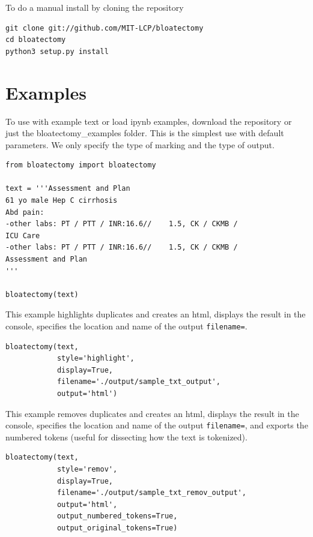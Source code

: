 \documentclass[runningheads,a4paper]{llncs}
\begin{document}
\medskip

\noindent To do a manual install by cloning the repository
\begin{lstlisting}[frame=single, style=customcode]
git clone git://github.com/MIT-LCP/bloatectomy
cd bloatectomy
python3 setup.py install
\end{lstlisting}


\section{Examples}

\noindent   To use with example text or load ipynb examples, download the repository or just the bloatectomy\_examples folder. 
This is the simplest use with default parameters. We only specify the type of marking and the type of output.

\begin{lstlisting}[frame=single, style=customcode]
from bloatectomy import bloatectomy

text = '''Assessment and Plan
61 yo male Hep C cirrhosis
Abd pain:
-other labs: PT / PTT / INR:16.6//    1.5, CK / CKMB /
ICU Care
-other labs: PT / PTT / INR:16.6//    1.5, CK / CKMB /
Assessment and Plan
'''

bloatectomy(text)
\end{lstlisting}

\medskip

\noindent This example highlights duplicates and creates an html, displays the result in the console, specifies the location and name of the output \verb|filename=|.

\begin{lstlisting}[frame=single, style=customcode]
bloatectomy(text, 
            style='highlight',
            display=True,
            filename='./output/sample_txt_output',
            output='html')
\end{lstlisting}

\medskip

\noindent This example removes duplicates and creates an html, displays the result in the console, specifies the location and name of the output \verb|filename=|, and exports the numbered tokens (useful for dissecting how the text is tokenized). 

\begin{lstlisting}[frame=single, style=customcode]
bloatectomy(text, 
            style='remov',
            display=True,
            filename='./output/sample_txt_remov_output',
            output='html',
            output_numbered_tokens=True,
            output_original_tokens=True)
\end{lstlisting}
\end{document}
